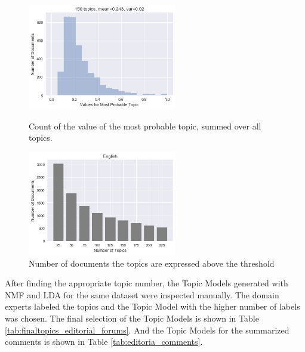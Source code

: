 	
\begin{figure}
	\centering
	\begin{minipage}[b]{0.5\textwidth}
		\includegraphics[width=6.5cm]{gfx/Hyperparams/150topics_English_nmf.png}
		\caption{Count of the value of the most probable topic, summed over all topics.}
		\label{fig:mean}
	\end{minipage}%
	\begin{minipage}[b]{0.5\textwidth}
		\includegraphics[width=6.5cm]{gfx/Hyperparams/English_nmf_Comments.png}
		\caption{Number of documents the topics are expressed above the threshold}
		\label{fig:topic number}
	\end{minipage}
\end{figure}	

After finding the appropriate topic number, the Topic Models generated with \ac{NMF} and \ac{LDA} for the same dataset were inspected manually. The domain experts labeled the topics and the Topic Model with the higher number of labels was chosen. The final selection of the Topic Models is shown in Table \ref{tab:finaltopics_editorial_forums}. And the Topic Models for the summarized comments is shown in Table \ref{tab:editoria_comments}. \\


